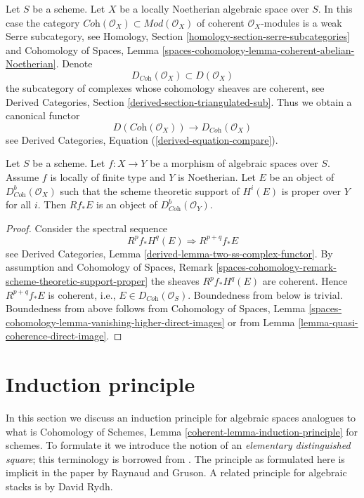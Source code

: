 \noindent
Let $S$ be a scheme. Let $X$ be a locally Noetherian algebraic space over $S$.
In this case the category
$\textit{Coh}(\mathcal{O}_X) \subset \textit{Mod}(\mathcal{O}_X)$
of coherent $\mathcal{O}_X$-modules is a weak Serre subcategory, see
Homology, Section \ref{homology-section-serre-subcategories}
and
Cohomology of Spaces, Lemma
\ref{spaces-cohomology-lemma-coherent-abelian-Noetherian}.
Denote
$$
D_{\textit{Coh}}(\mathcal{O}_X) \subset D(\mathcal{O}_X)
$$
the subcategory of complexes whose cohomology sheaves are coherent, see
Derived Categories, Section \ref{derived-section-triangulated-sub}.
Thus we obtain a canonical functor
\begin{equation}
\label{equation-compare-coherent}
D(\textit{Coh}(\mathcal{O}_X))
\longrightarrow
D_{\textit{Coh}}(\mathcal{O}_X)
\end{equation}
see Derived Categories, Equation (\ref{derived-equation-compare}).

\begin{lemma}
\label{lemma-direct-image-coherent}
Let $S$ be a scheme. Let $f : X \to Y$ be a morphism of algebraic spaces
over $S$. Assume $f$ is locally of finite type and $Y$ is Noetherian.
Let $E$ be an object of $D^b_{\textit{Coh}}(\mathcal{O}_X)$ such that the
scheme theoretic support of $H^i(E)$ is proper over $Y$ for all $i$.
Then $Rf_*E$ is an object of $D^b_{\textit{Coh}}(\mathcal{O}_Y)$.
\end{lemma}

\begin{proof}
Consider the spectral sequence
$$
R^pf_*H^q(E) \Rightarrow R^{p + q}f_*E
$$
see Derived Categories, Lemma \ref{derived-lemma-two-ss-complex-functor}.
By assumption and
Cohomology of Spaces, Remark
\ref{spaces-cohomology-remark-scheme-theoretic-support-proper}
the sheaves $R^pf_*H^q(E)$ are coherent. Hence
$R^{p + q}f_*E$ is coherent, i.e., $E \in D_{\textit{Coh}}(\mathcal{O}_S)$.
Boundedness from below is trivial. Boundedness from above
follows from
Cohomology of Spaces, Lemma
\ref{spaces-cohomology-lemma-vanishing-higher-direct-images}
or from
Lemma \ref{lemma-quasi-coherence-direct-image}.
\end{proof}




\section{Induction principle}
\label{section-induction}

\noindent
In this section we discuss an induction principle for algebraic spaces
analogues to what is
Cohomology of Schemes, Lemma \ref{coherent-lemma-induction-principle}
for schemes. To formulate it we introduce the notion of an
{\it elementary distinguished square}; this terminology is borrowed
from \cite{MV}.
The principle as formulated here is implicit in the paper \cite{GruRay}
by Raynaud and Gruson.
A related principle for algebraic stacks is
\cite[Theorem D]{rydh_etale_devissage} by David Rydh.

